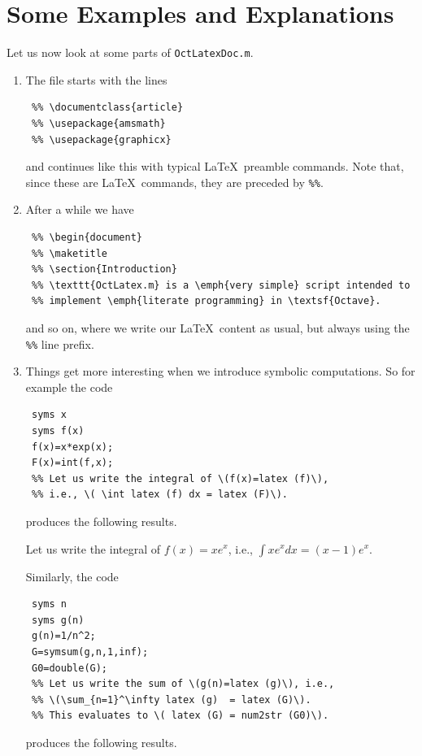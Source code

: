 \documentclass{article}
\begin{document}
 \section{Some Examples and Explanations}
 Let us now look at some parts of \texttt{OctLatexDoc.m}.
 \begin{enumerate}
 \item The file starts with the lines 
 \begin{lstlisting}
 %% \documentclass{article}
 %% \usepackage{amsmath}
 %% \usepackage{graphicx}
 \end{lstlisting}
 and continues like this with typical \LaTeX\ preamble commands. Note that, since these are 
 \LaTeX\ commands, they are preceded by \texttt{\%\%}.
 \item After a while we have  
 \begin{lstlisting}
 %% \begin{document}
 %% \maketitle
 %% \section{Introduction}
 %% \texttt{OctLatex.m} is a \emph{very simple} script intended to 
 %% implement \emph{literate programming} in \textsf{Octave}. 
 \end{lstlisting}
 and so on, where we write our \LaTeX\ content as usual, but always using the \texttt{\%\%} line prefix.
 \item Things get more interesting when we introduce symbolic computations. So for example the code 
 \begin{lstlisting}
 syms x
 syms f(x)
 f(x)=x*exp(x);
 F(x)=int(f,x);
 %% Let us write the integral of \(f(x)=latex (f)\), 
 %% i.e., \( \int latex (f) dx = latex (F)\).
 \end{lstlisting}
 produces the following results.
 
 \qquad Let us write the integral of \(f(x)=x e^{x}\), i.e., \( \int x e^{x} dx = \left(x - 1\right) e^{x}\).

 Similarly,  the code
 \begin{lstlisting}
 syms n
 syms g(n)
 g(n)=1/n^2;
 G=symsum(g,n,1,inf);
 G0=double(G);
 %% Let us write the sum of \(g(n)=latex (g)\), i.e., 
 %% \(\sum_{n=1}^\infty latex (g)  = latex (G)\). 
 %% This evaluates to \( latex (G) = num2str (G0)\). 
 \end{lstlisting}
 produces the following results.


\end{enumerate}
\end{document}
